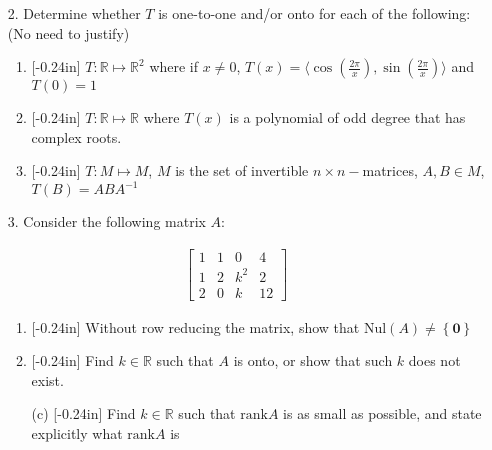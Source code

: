 \documentclass[letterpaper,12pt]{article}
\newcommand{\set}[1]{\left\{ #1 \right\}}
\theoremstyle{definition}
\begin{document}
\pagebreak
\begin{enumerate}
    \item[2.]  Determine whether $T$ is one-to-one and/or onto for each of the following: (No need to justify) \begin{enumerate}
        \item\reversemarginpar{}[-0.24in] $T: \mathbb{R} \mapsto \mathbb{R}^2$ where if $x \neq 0$, $T(x)= \langle\cos\left (\frac{2\pi}{x} \right) ,\sin \left (\frac{2\pi}{x} \right)\rangle$ and $T(0) = 1$
        \vspace{2.4in}
        \item\reversemarginpar{}[-0.24in] $T:\mathbb{R} \mapsto \mathbb{R}$ where $T(x)$ is a polynomial of odd degree that has complex roots.
        \vspace{2.4in}
        \item\reversemarginpar{}[-0.24in] $T: M \mapsto M$, $M$ is the set of invertible $n\times n-$matrices, $A,B \in M$, $T(B) = ABA^{-1}$
    \end{enumerate}
\end{enumerate}
\pagebreak
\renewcommand{\arraystretch}{1}
\begin{enumerate}
    \item[3.] Consider the following matrix $A$: \end{enumerate} \begin{align*}
        \begin{bmatrix}
        1 & 1 & 0 & 4 \\
        1 & 2 & k^2 & 2\\
        2 & 0 & k & 12
    \end{bmatrix}
    \end{align*}
\begin{enumerate}
\item[]
    \begin{enumerate}
        \item\reversemarginpar{}[-0.24in] Without row reducing the matrix, show that $\mathrm{Nul}(A) \neq \set{\mathbf{0}}$
        \vspace{3in}
        \item\reversemarginpar{}[-0.24in] Find $k\in\mathbb{R}$ such that $A$ is onto, or show that such $k$ does not exist.
    \end{enumerate}
\end{enumerate}
\pagebreak
\begin{enumerate}
    \item[] \begin{enumerate}
        \item[(c)]\reversemarginpar{}[-0.24in] Find $k\in\mathbb{R}$ such that $\mathrm{rank}A$ is as small as possible, and state explicitly what $\mathrm{rank}A$ is
    \end{enumerate}
\end{enumerate}
\pagebreak
\end{document}

